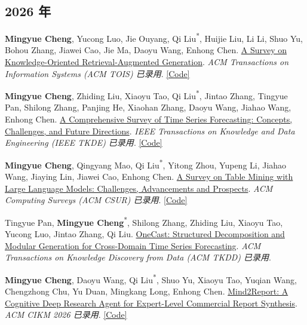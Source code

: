 \documentclass[UTF8,fontset=fandol,scheme=plain,11pt,a4paper]{ctexart}
\newcommand{\pubentry}[1]{\item \begin{minipage}[t]{\linewidth}#1\end{minipage}}
\begin{document}
\subsection{2026 年}
\begin{publist}[start=4]
\pubentry{\textbf{Mingyue Cheng}, Yucong Luo, Jie Ouyang, Qi Liu\textsuperscript{*}, Huijie Liu, Li Li, Shuo Yu, Bohou Zhang, Jiawei Cao, Jie Ma, Daoyu Wang, Enhong Chen. \href{https://arxiv.org/pdf/2503.10677}{A Survey on Knowledge-Oriented Retrieval-Augmented Generation}. \emph{ACM Transactions on Information Systems (ACM TOIS) 已录用}. \href{https://github.com/USTCAGI/Awesome-Papers-Retrieval-Augmented-Generation}{[Code]}}

\pubentry{\textbf{Mingyue Cheng}, Zhiding Liu, Xiaoyu Tao, Qi Liu\textsuperscript{*}, Jintao Zhang, Tingyue Pan, Shilong Zhang, Panjing He, Xiaohan Zhang, Daoyu Wang, Jiahao Wang, Enhong Chen. \href{https://d197for5662m48.cloudfront.net/documents/publicationstatus/253323/preprint\_pdf/0d1d8e876fb85a212190bc9200dcc3f3.pdf}{A Comprehensive Survey of Time Series Forecasting: Concepts, Challenges, and Future Directions}. \emph{IEEE Transactions on Knowledge and Data Engineering (IEEE TKDE) 已录用}. \href{https://github.com/USTCAGI/Awesome-Papers-Time-Series-Forecasting}{[Code]}}

\pubentry{\textbf{Mingyue Cheng}, Qingyang Mao, Qi Liu\textsuperscript{*}, Yitong Zhou, Yupeng Li, Jiahao Wang, Jiaying Lin, Jiawei Cao, Enhong Chen. \href{https://www.techrxiv.org/doi/full/10.36227/techrxiv.174352282.22844759/v1}{A Survey on Table Mining with Large Language Models: Challenges, Advancements and Prospects}. \emph{ACM Computing Surveys (ACM CSUR) 已录用}. \href{https://github.com/USTCAGI/Awesome-LLM-Table-Mining}{[Code]}}

\pubentry{Tingyue Pan, \textbf{Mingyue Cheng}\textsuperscript{*}, Shilong Zhang, Zhiding Liu, Xiaoyu Tao, Yucong Luo, Jintao Zhang, Qi Liu. \href{https://arxiv.org/pdf/2510.24028}{OneCast: Structured Decomposition and Modular Generation for Cross-Domain Time Series Forecasting}. \emph{ACM Transactions on Knowledge Discovery from Data (ACM TKDD) 已录用}.}

\pubentry{\textbf{Mingyue Cheng}, Daoyu Wang, Qi Liu\textsuperscript{*}, Shuo Yu, Xiaoyu Tao, Yuqian Wang, Chengzhong Chu, Yu Duan, Mingkang Long, Enhong Chen. \href{https://arxiv.org/pdf/2601.04879}{Mind2Report: A Cognitive Deep Research Agent for Expert-Level Commercial Report Synthesis}. \emph{ACM CIKM 2026 已录用}. \href{https://github.com/Melmaphother/Mind2Report}{[Code]}}


\end{publist}
\end{document}
